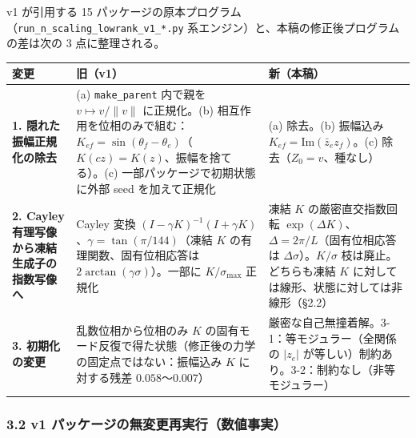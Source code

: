 \documentclass[
  10pt,
  a4paper,
]{ltjsarticle}
\newcounter{none} %
\begin{document}
v1 が引用する 15
パッケージの原本プログラム（\texttt{run\_n\_scaling\_lowrank\_v1\_*.py}
系エンジン）と、本稿の修正後プログラムの差は次の 3 点に整理される。

{\def\LTcaptype{none} %
\begin{longtable}[]{@{}
  >{\raggedright\arraybackslash}p{}
  >{\raggedright\arraybackslash}p{}
  >{\raggedright\arraybackslash}p{}@{}}
\toprule\noalign{}
\begin{minipage}[b]{\linewidth}\raggedright
変更
\end{minipage} & \begin{minipage}[b]{\linewidth}\raggedright
旧（v1）
\end{minipage} & \begin{minipage}[b]{\linewidth}\raggedright
新（本稿）
\end{minipage} \\
\midrule\noalign{}
\endhead
\bottomrule\noalign{}
\endlastfoot
\textbf{1. 隠れた振幅正規化の除去} & (a) \texttt{make\_parent} 内で親を
\(v\mapsto v/\|v\|\) に正規化。(b)
相互作用を位相のみで組む：\(K_{ef}=\sin(\theta_f-\theta_e)\)（\(K(cz)=K(z)\)、振幅を捨てる）。(c)
一部パッケージで初期状態に外部 seed を加えて正規化 & (a) 除去。(b)
振幅込み \(K_{ef}=\mathrm{Im}(\bar z_ez_f)\)。(c)
除去（\(Z_0=v\)、種なし） \\
\textbf{2. Cayley 有理写像から凍結生成子の指数写像へ} & Cayley 変換
\((I-\gamma K)^{-1}(I+\gamma K)\)、\(\gamma=\tan(\pi/144)\)（凍結 \(K\)
の有理関数、固有位相応答は \(2\arctan(\gamma\sigma)\)）。一部に
\(K/\sigma_{\max}\) 正規化 & 凍結 \(K\) の厳密直交指数回転
\(\exp(\Delta K)\)、\(\Delta=2\pi/L\)（固有位相応答は
\(\Delta\sigma\)）。\(K/\sigma\) 枝は廃止。どちらも凍結 \(K\)
に対しては線形、状態に対しては非線形（§2.2） \\
\textbf{3. 初期化の変更} & 乱数位相から位相のみ \(K\)
の固有モード反復で得た状態（修正後の力学の固定点ではない：振幅込み \(K\)
に対する残差 \(0.058\)〜\(0.007\)） &
厳密な自己無撞着解。3-1：等モジュラー（全関係の \(|z_e|\)
が等しい）制約あり。3-2：制約なし（非等モジュラー） \\
\end{longtable}
}

\subsubsection{3.2 v1
パッケージの無変更再実行（数値事実）}\label{v1-ux30d1ux30c3ux30b1ux30fcux30b8ux306eux7121ux5909ux66f4ux518dux5b9fux884cux6570ux5024ux4e8bux5b9f}
\end{document}
